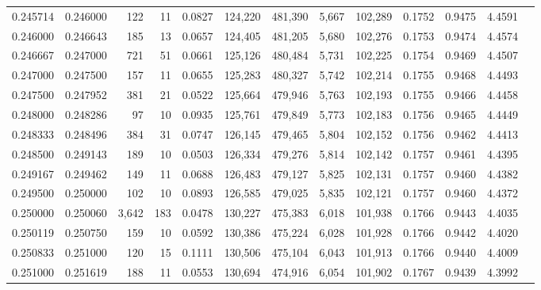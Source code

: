 \begin{tabular}{rrrrrrrrrrrrr}
0.245714 & 0.246000 &   122 &  11 &                                     0.0827 & 124,220 & 481,390 &   5,667 & 102,289 & 0.1752 & 0.9475 & 4.4591 \\
0.246000 & 0.246643 &   185 &  13 &                                     0.0657 & 124,405 & 481,205 &   5,680 & 102,276 & 0.1753 & 0.9474 & 4.4574 \\
0.246667 & 0.247000 &   721 &  51 &                                     0.0661 & 125,126 & 480,484 &   5,731 & 102,225 & 0.1754 & 0.9469 & 4.4507 \\
0.247000 & 0.247500 &   157 &  11 &                                     0.0655 & 125,283 & 480,327 &   5,742 & 102,214 & 0.1755 & 0.9468 & 4.4493 \\
0.247500 & 0.247952 &   381 &  21 &                                     0.0522 & 125,664 & 479,946 &   5,763 & 102,193 & 0.1755 & 0.9466 & 4.4458 \\
0.248000 & 0.248286 &    97 &  10 &                                     0.0935 & 125,761 & 479,849 &   5,773 & 102,183 & 0.1756 & 0.9465 & 4.4449 \\
0.248333 & 0.248496 &   384 &  31 &                                     0.0747 & 126,145 & 479,465 &   5,804 & 102,152 & 0.1756 & 0.9462 & 4.4413 \\
0.248500 & 0.249143 &   189 &  10 &                                     0.0503 & 126,334 & 479,276 &   5,814 & 102,142 & 0.1757 & 0.9461 & 4.4395 \\
0.249167 & 0.249462 &   149 &  11 &                                     0.0688 & 126,483 & 479,127 &   5,825 & 102,131 & 0.1757 & 0.9460 & 4.4382 \\
0.249500 & 0.250000 &   102 &  10 &                                     0.0893 & 126,585 & 479,025 &   5,835 & 102,121 & 0.1757 & 0.9460 & 4.4372 \\
0.250000 & 0.250060 & 3,642 & 183 &                                     0.0478 & 130,227 & 475,383 &   6,018 & 101,938 & 0.1766 & 0.9443 & 4.4035 \\
0.250119 & 0.250750 &   159 &  10 &                                     0.0592 & 130,386 & 475,224 &   6,028 & 101,928 & 0.1766 & 0.9442 & 4.4020 \\
0.250833 & 0.251000 &   120 &  15 &                                     0.1111 & 130,506 & 475,104 &   6,043 & 101,913 & 0.1766 & 0.9440 & 4.4009 \\
0.251000 & 0.251619 &   188 &  11 &                                     0.0553 & 130,694 & 474,916 &   6,054 & 101,902 & 0.1767 & 0.9439 & 4.3992 \\

\end{tabular}
